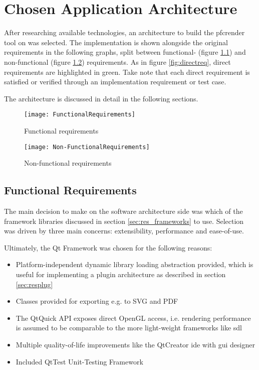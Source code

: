 \chapter{Chosen Application Architecture}

After researching available technologies, an architecture to build the pfcrender tool on was selected. The implementation is shown alongside the original requirements in the following graphs, split between functional- (figure \ref{fr}) and non-functional (figure \ref{nfr}) requirements. As in figure \ref{fig:directreq}, direct requirements are highlighted in green. Take note that each direct requirement is satisfied or verified through an implementation requirement or test case.

The architecture is discussed in detail in the following sections.

\begin{figure}[p]
	\texttt{[image: FunctionalRequirements]}
	\caption{Functional requirements}
	\label{fr}
\end{figure}

\begin{figure}[p]
	\texttt{[image: Non-FunctionalRequirements]}
	\caption{Non-functional requirements}
	\label{nfr}
\end{figure}

\section{Functional Requirements}
The main decision to make on the software architecture side was which of the framework libraries discussed in section \ref{sec:res_frameworks} to use.
Selection was driven by three main concerns: extensibility, performance and ease-of-use.

Ultimately, the Qt Framework was chosen for the following reasons:
\begin{itemize}
	\item Platform-independent dynamic library loading abstraction provided, which is useful for implementing a plugin architecture as described in section \ref{sec:resplug}
	\item Classes provided for exporting e.g. to SVG and PDF
	\item The QtQuick API exposes direct OpenGL access, i.e. rendering performance is assumed to be comparable to the more light-weight frameworks like \gls{sdl}
	\item Multiple quality-of-life improvements like the QtCreator \gls{ide} with \gls{gui} designer
	\item Included QtTest Unit-Testing Framework
\end{itemize}

